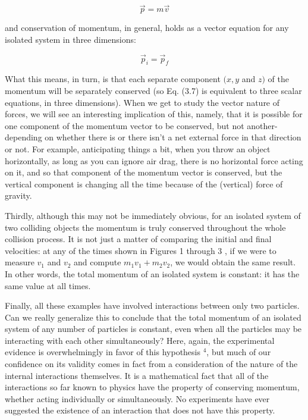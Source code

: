 \documentclass[10pt]{article}
\begin{document}
$$
\vec{p}=m \vec{v}
$$

and conservation of momentum, in general, holds as a vector equation for any isolated system in three dimensions:


\begin{equation*}
\vec{p}_{i}=\vec{p}_{f} \tag{3.7}
\end{equation*}


What this means, in turn, is that each separate component $(x, y$ and $z)$ of the momentum will be separately conserved (so Eq. (3.7) is equivalent to three scalar equations, in three dimensions). When we get to study the vector nature of forces, we will see an interesting implication of this, namely, that it is possible for one component of the momentum vector to be conserved, but not another-depending on whether there is or there isn't a net external force in that direction or not. For example, anticipating things a bit, when you throw an object horizontally, as long as you can ignore air drag, there is no horizontal force acting on it, and so that component of the momentum vector is conserved, but the vertical component is changing all the time because of the (vertical) force of gravity.

Thirdly, although this may not be immediately obvious, for an isolated system of two colliding objects the momentum is truly conserved throughout the whole collision process. It is not just a matter of comparing the initial and final velocities: at any of the times shown in Figures 1 through 3 , if we were to measure $v_{1}$ and $v_{2}$ and compute $m_{1} v_{1}+m_{2} v_{2}$, we would obtain the same result. In other words, the total momentum of an isolated system is constant: it has the same value at all times.

Finally, all these examples have involved interactions between only two particles. Can we really generalize this to conclude that the total momentum of an isolated system of any number of particles is constant, even when all the particles may be interacting with each other simultaneously? Here, again, the experimental evidence is overwhelmingly in favor of this hypothesis ${ }^{4}$, but much of our confidence on its validity comes in fact from a consideration of the nature of the internal interactions themselves. It is a mathematical fact that all of the interactions so far known to physics have the property of conserving momentum, whether acting individually or simultaneously. No experiments have ever suggested the existence of an interaction that does not have this property.
\end{document}
